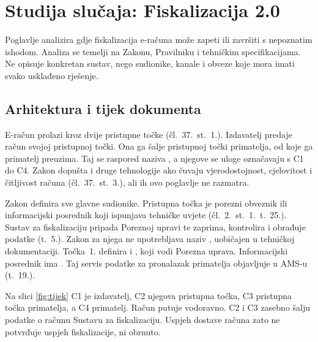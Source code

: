 \section{Studija slučaja: Fiskalizacija 2.0}
\label{ch:studija}

Poglavlje analizira gdje fiskalizacija e-računa može zapeti ili završiti s
nepoznatim ishodom. Analiza se temelji na Zakonu, Pravilniku i tehničkim
specifikacijama. Ne opisuje konkretan sustav, nego sudionike, kanale i
obveze koje mora imati svako usklađeno rješenje.

\subsection{Arhitektura i tijek dokumenta}
\label{sec:arhitektura}

E-račun prolazi kroz dvije pristupne točke (čl.~37.~st.~1.). Izdavatelj
predaje račun svojoj pristupnoj točki. Ona ga šalje pristupnoj točki
primatelja, od koje ga primatelj preuzima. Taj se raspored naziva
, a njegove se uloge
označavaju s C1 do C4. Zakon dopušta i druge tehnologije ako čuvaju
vjerodostojnost, cjelovitost i čitljivost računa (čl.~37.~st.~3.), ali ih
ovo poglavlje ne razmatra.

Zakon definira sve glavne sudionike. Pristupna točka je porezni obveznik
ili informacijski posrednik koji ispunjava tehničke uvjete
(čl.~2.~st.~1.~t.~25.). Sustav za fiskalizaciju pripada Poreznoj upravi te
zaprima, kontrolira i obrađuje podatke (t.~5.). Zakon za njega ne
upotrebljava naziv ,
uobičajen u tehničkoj dokumentaciji. Točka~1. definira i
, koji vodi Porezna uprava. Informacijski posrednik ima
. Taj servis podatke za pronalazak
primatelja objavljuje u AMS-u (t.~19.).

Na slici \ref{fig:tijek} C1 je izdavatelj, C2 njegova pristupna točka, C3
pristupna točka primatelja, a C4 primatelj. Račun putuje vodoravno. C2 i C3
zasebno šalju podatke o računu Sustavu za fiskalizaciju. Uspjeh dostave
računa zato ne potvrđuje uspjeh fiskalizacije, ni obrnuto.

